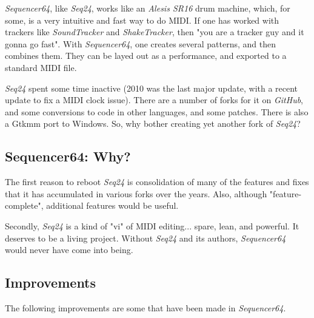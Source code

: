 \documentclass[
 11pt,
 twoside,
 a4paper,
 headinclude,
 footinclude,
 final                                 %
]{article}
\begin{document}
   \textsl{Sequencer64}, like \textsl{Seq24},
   works like an \textsl{Alesis SR16} drum machine,
   which, for some, is a very intuitive and fast way to do MIDI.
   If one has worked with trackers like \textsl{SoundTracker} and
   \textsl{ShakeTracker}, then "you are a tracker guy and it gonna go fast".
   With \textsl{Sequencer64}, one creates several patterns, and then
   combines them.  They can be layed out as a performance,
   and exported to a standard MIDI file.

   \textsl{Seq24} spent some time inactive
   (2010 was the last major update, with a
   recent update to fix a MIDI clock issue).  There are a number of
   forks for it on \textsl{GitHub}, and some conversions
   to code in other languages, and some patches.
   There is also a Gtkmm port to Windows.
   So, why bother creating yet another fork of \textsl{Seq24}?

\subsection{Sequencer64: Why?}
\label{subsec:introduction_seq64_vs_others}

   The first reason to reboot \textsl{Seq24} is consolidation of many of the
   features and fixes that it has accumulated in various forks over the years.
   Also, although "feature-complete", additional features would be useful.

   Secondly, \textsl{Seq24} is a kind of "vi" of MIDI editing... spare,
   lean, and powerful.  It deserves to be a living project.  Without
   \textsl{Seq24} and its authors, \textsl{Sequencer64} would never have come
   into being.

\subsection{Improvements}
\label{subsec:improvements}

   The following improvements are some that have been made in
   \textsl{Sequencer64}.
\end{document}
